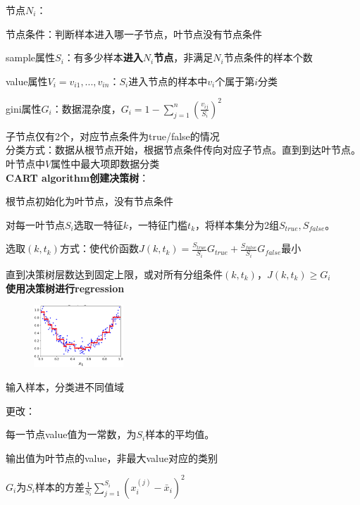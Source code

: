 \documentclass[UTF8]{ctexart}
\begin{document}
  节点$N_i$：

  \quad 节点条件：判断样本进入哪一子节点，叶节点没有节点条件
  
  \quad sample属性$S_i$：有多少样本\textbf{进入$N_i$节点}，非满足$N_i$节点条件的样本个数

  \quad value属性$V_i = v_{i1}, ..., v_{in}$：$S_i$进入节点的样本中$v_i$个属于第$i$分类

  \quad gini属性$G_i$：数据混杂度，$G_i = 1-\sum_{j=1}^{n}(\frac{v_{ij}}{S_i})^2$
  
  \quad 子节点仅有2个，对应节点条件为true/false的情况\\
分类方式：数据从根节点开始，根据节点条件传向对应子节点。直到到达叶节点。叶节点中$V$属性中最大项即数据分类\\
\textbf{CART algorithm创建决策树}：

  根节点初始化为叶节点，没有节点条件
  
  对每一叶节点$S_i$选取一特征$k$，一特征门槛$t_k$，将样本集分为2组$S_{true}, S_{false}$。
  
  \quad 选取$(k, t_k)$方式：使代价函数$J(k, t_k) = \frac{S_{true}}{S_i}G_{true} + \frac{S_{false}}{S_i}G_{false}$最小

  直到决策树层数达到固定上限，或对所有分组条件$(k, t_k)$，$J(k, t_k) \geq G_i$\\
\textbf{使用决策树进行regression}

  \begin{figure}[H] %
    \centering %
    \includegraphics[width=0.3\textwidth]{note_images/deci_tree_regression.png} %
  \end{figure}

  输入样本，分类进不同值域

  更改：
  
  \quad 每一节点value值为一常数，为$S_i$样本的平均值。
  
  \quad 输出值为叶节点的value，非最大value对应的类别

  \quad $G_i$为$S_i$样本的方差$\frac{1}{S_i}\sum_{j=1}^{S_i}(x_i^{(j)} - \bar{x}_i)^2$

\end{document}
